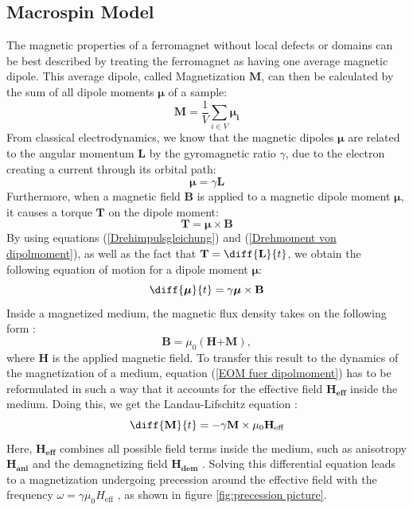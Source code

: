 \subsection{Macrospin Model}
The magnetic properties of a ferromagnet without local defects or domains can be best described by treating the ferromagnet as having one average magnetic dipole. This average dipole, called Magnetization $\mathbf{M}$, can then be calculated by the sum of all dipole moments $\boldsymbol{\mu}$ of a sample:
\begin{equation}    
\mathbf{M} = \frac{1}{V}\sum_{i\in V}{\boldsymbol{\mu_\textbf{i}}}
\end{equation}
From classical electrodynamics, we know that the magnetic dipoles $\boldsymbol{\mu}$ are related to the angular momentum $\textbf{L}$ by the gyromagnetic ratio $\gamma$, due to the electron creating a current through its orbital path:
\begin{equation}
   \boldsymbol{\mu} = \gamma \textbf{L} 
   \label{Drehimpulsgleichung}
\end{equation}
Furthermore, when a magnetic field $\mathbf{B}$ is applied to a magnetic dipole moment $\boldsymbol{\mu}$, it causes a torque $\textbf{T}$ on the dipole moment:
\begin{equation}
    \textbf{T} = \boldsymbol{\mu} \times \mathbf{B}
    \label{Drehmoment von dipolmoment}
\end{equation}
By using equations (\ref{Drehimpulsgleichung}) and (\ref{Drehmoment von dipolmoment}), as well as the fact that $\textbf{T} = \diff{\textbf{L}}{t}$, we obtain the following equation of motion for a dipole moment $\boldsymbol{\mu}$:
\begin{equation}
    \diff{\boldsymbol{\mu}}{t} = \gamma \boldsymbol{\mu} \times \mathbf{B} 
    \label{EOM fuer dipolmoment}
\end{equation}
Inside a magnetized medium, the magnetic flux density takes on the following form \cite{obstbaum2014}:
\begin{equation} 
\textbf{B} = \mu_0(\textbf{H+M}),
\end{equation}
where $\textbf{H}$ is the applied magnetic field. To transfer this result to the dynamics of the magnetization of a medium, equation (\ref{EOM fuer dipolmoment}) has to be reformulated in such a way that it accounts for the effective field $\mathbf{{H_{\text{eff}}}}$ inside the medium. Doing this, we get the Landau-Lifschitz equation \cite{obstbaum2014}:
\begin{equation}
    \diff{\textbf{M}}{t} = - \gamma \textbf{M} \times \mu_0 \mathbf{{H_{\text{eff}}}}
    \label{Landau-Lifschitz}
\end{equation}
Here, $\mathbf{{H_{\text{eff}}}}$ combines all possible field terms inside the medium, such as anisotropy $\mathbf{H_{\text{ani}}}$ and the demagnetizing field $\mathbf{H_{\text{dem}}}$ \cite{obstbaum2014}.
Solving this differential equation leads to a magnetization undergoing precession around the effective field with the frequency $ \omega = \gamma \mu_0 H_{\text{eff}}$ \cite{Mueller2019}, as shown in figure \ref{fig:precession picture}.

